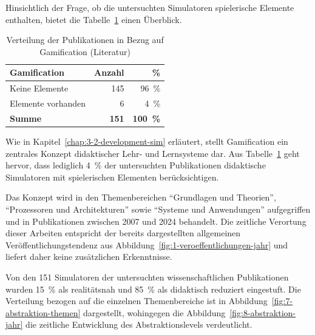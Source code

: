 Hinsichtlich der Frage, ob die untersuchten Simulatoren spielerische Elemente enthalten, bietet die Tabelle~\ref{tab:gamification} einen Überblick.

\begin{table}[!htbp]
    \centering
    \begin{tabular}{l r r}
        \hline
        \textbf{Gamification} & \textbf{Anzahl} & \textbf{\%} \\
        \hline
        Keine Elemente     & 145 & 96~\% \\
        Elemente vorhanden & 6   & 4~\%  \\
        \hline
        \textbf{Summe}     & \textbf{151} & \textbf{100~\%} \\
        \hline
    \end{tabular}
    \caption{Verteilung der Publikationen in Bezug auf Gamification (Literatur)}
    \label{tab:gamification}
\end{table}

Wie in Kapitel~\ref{chap:3-2-development-sim} erläutert, stellt Gamification ein zentrales Konzept didaktischer Lehr- und Lernsysteme dar. Aus Tabelle~\ref{tab:gamification} geht hervor, dass lediglich 4~\% der untersuchten Publikationen didaktische Simulatoren mit spielerischen Elementen berücksichtigen.

Das Konzept wird in den Themenbereichen \enquote{Grundlagen und Theorien}, \enquote{Prozessoren und Architekturen} sowie \enquote{Systeme und Anwendungen} aufgegriffen und in Publikationen zwischen 2007 und 2024 behandelt. Die zeitliche Verortung dieser Arbeiten entspricht der bereits dargestellten allgemeinen Veröffentlichungstendenz aus Abbildung~\ref{fig:1-veroeffentlichungen-jahr} und liefert daher keine zusätzlichen Erkenntnisse.  

Von den 151 Simulatoren der untersuchten wissenschaftlichen Publikationen wurden 15~\% als realitätsnah und 85~\% als didaktisch reduziert eingestuft. Die Verteilung bezogen auf die einzelnen Themenbereiche ist in Abbildung~\ref{fig:7-abstraktion-themen} dargestellt, wohingegen die Abbildung~\ref{fig:8-abstraktion-jahr} die zeitliche Entwicklung des Abstraktionslevels verdeutlicht.

